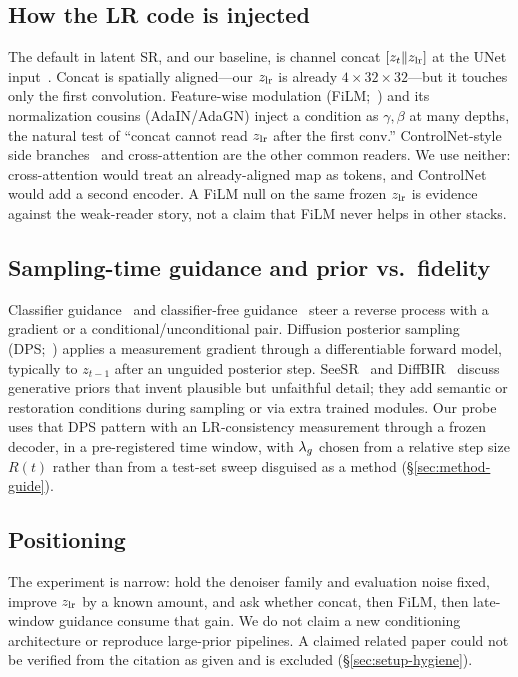 \subsection{How the LR code is injected}
The default in latent SR, and our baseline, is channel concat
$[z_{t}\Vert z_{\mathrm{lr}}]$ at the UNet input~\citep{rombach2022high}.
Concat is spatially aligned---our $z_{\mathrm{lr}}$ is already $4\times 32\times 32$---but
it touches only the first convolution.
Feature-wise modulation (FiLM;~\citealp{perez2018film}) and its
normalization cousins (AdaIN/AdaGN) inject a condition as
$\gamma,\beta$ at many depths, the natural test of
``concat cannot read $z_{\mathrm{lr}}$ after the first conv.''
ControlNet-style side branches~\citep{zhang2023adding} and
cross-attention are the other common readers.
We use neither: cross-attention would treat an already-aligned map as
tokens, and ControlNet would add a second encoder.
A FiLM null on the same frozen $z_{\mathrm{lr}}$ is evidence against the
weak-reader story, not a claim that FiLM never helps in other stacks.

\subsection{Sampling-time guidance and prior vs.\ fidelity}
Classifier guidance~\citep{dhariwal2021diffusion} and classifier-free
guidance~\citep{ho2022classifier} steer a reverse process with a
gradient or a conditional/unconditional pair.
Diffusion posterior sampling
(DPS;~\citealp{chung2023diffusion}) applies a measurement gradient
through a differentiable forward model, typically to $z_{t-1}$ after
an unguided posterior step.
SeeSR~\citep{wu2024seesr} and DiffBIR~\citep{lin2024diffbir}
discuss generative priors that invent plausible but unfaithful
detail; they add semantic or restoration conditions during sampling
or via extra trained modules.
Our probe uses that DPS pattern with an LR-consistency measurement
through a frozen decoder, in a pre-registered time window, with
$\lambda_{g}$ chosen from a relative step size $R(t)$ rather than from a
test-set sweep disguised as a method (\S\ref{sec:method-guide}).

\subsection{Positioning}
The experiment is narrow: hold the denoiser family and evaluation
noise fixed, improve $z_{\mathrm{lr}}$ by a known amount, and ask whether
concat, then FiLM, then late-window guidance consume that gain.
We do not claim a new conditioning architecture or reproduce
large-prior pipelines.
A claimed related paper could not be verified from the citation as
given and is excluded (\S\ref{sec:setup-hygiene}).
